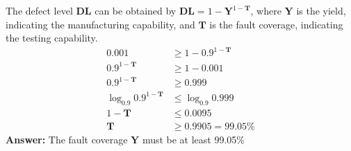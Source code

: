 The defect level $\textbf{DL}$ can be obtained by $\textbf{DL} = 1 - \textbf{Y} ^ {1 - \textbf{T}}$, where $\textbf{Y}$ is the yield, indicating the manufacturing capability, and $\textbf{T}$ is the fault coverage, indicating the testing capability.
\begin{align*} 
0.001                             &\geq 1 - 0.9 ^ {1 - \textbf{T}} \\
0.9 ^ {1 - \textbf{T}}            &\geq 1 - 0.001 \\
0.9 ^ {1 - \textbf{T}}            &\geq 0.999 \\
\log_{0.9} 0.9 ^ {1 - \textbf{T}} &\leq \log_{0.9} 0.999 \\
1 - \textbf{T}                    &\leq 0.0095 \\
\textbf{T}                        &\geq 0.9905 = 99.05\%
\end{align*}
\textbf{Answer:} The fault coverage $\textbf{Y}$ must be at least 99.05\%
